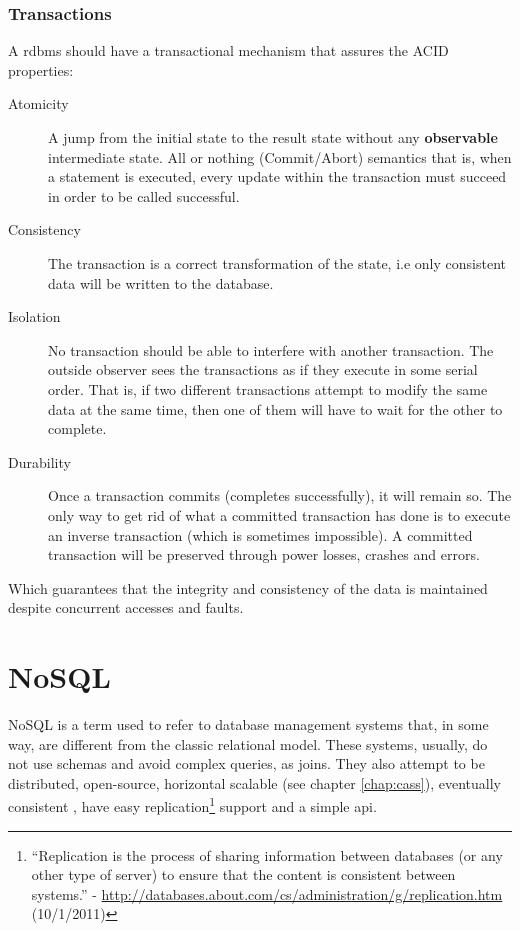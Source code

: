 \subsubsection{Transactions}
A \ac{rdbms} should have a transactional mechanism that assures the ACID properties:
\begin{description}
	\item[Atomicity] A jump from the initial state to the result state without any \textbf{observable} intermediate state. All or nothing (Commit/Abort) semantics that is, when a statement is executed, every update within the transaction must succeed in order to be called successful.
	\item[Consistency] The transaction is a correct transformation of the state, i.e only consistent data will be written to the database.
	\item[Isolation] No transaction should be able to interfere with another transaction. The outside observer sees the transactions as if they execute in some serial order. That is, if two different transactions attempt to modify the same data at the same time, then one of them will have to wait for the other to complete.
	\item[Durability] Once a transaction commits (completes successfully), it will remain so. The only way to get rid of what a committed transaction has done is to execute an inverse transaction (which is sometimes impossible). A committed transaction will be preserved through power losses, crashes and errors. 
\end{description}

Which guarantees that the integrity and consistency of the data is maintained despite concurrent accesses and faults.  

\section{NoSQL}
\label{sec:nosql}
NoSQL \cite{seeger09} is a term used to refer to database management systems that, in some way, are different from the classic relational model. These systems, usually, do not use schemas and avoid complex queries, as joins. They also attempt to be distributed, open-source, horizontal scalable (see chapter \ref{chap:cass}), eventually consistent \cite{Vogels2008}, have easy replication\footnote{``Replication is the process of sharing information between databases (or any other type of server) to ensure that the content is consistent between systems.'' - \url{http://databases.about.com/cs/administration/g/replication.htm} (10/1/2011)} support and a simple \ac{api}.

